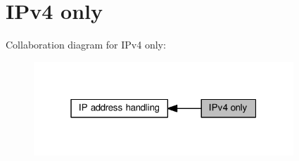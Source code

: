 \hypertarget{group__ip4addr}{}\section{I\+Pv4 only}
\label{group__ip4addr}
Collaboration diagram for I\+Pv4 only\+:
\nopagebreak
\begin{figure}[H]
\begin{center}
\leavevmode
\includegraphics[width=277pt]{group__ip4addr}
\end{center}
\end{figure}

